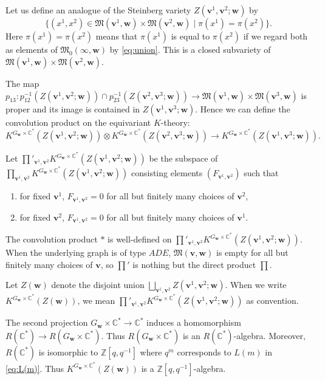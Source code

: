\documentclass[12pt]{amsart}
\def\Bbb{\mathbb}
\def\frak{\mathfrak}
\theoremstyle{definition}
\theoremstyle{remark}
\numberwithin{equation}{subsection}
\newcommand{\C}{{\Bbb C}}
\newcommand{\Z}{{\Bbb Z}}
\newcommand{\M}{{\frak M}} %
\newcommand{\bv}{{\mathbf v}} %
\newcommand{\bw}{{\mathbf w}} %
\newcommand{\Zw}{Z(\bw)}
\begin{document}
\subsection{}\label{subsec:homdef}
Let us define an analogue of the Steinberg variety
$Z(\bv^1,\bv^2;\bw)$ by
\begin{equation}\label{eq:def_Steinberg}
   \{ (x^1, x^2)\in \M(\bv^1,\bw)\times\M(\bv^2,\bw) \mid
 \pi(x^1) = \pi(x^2)
\}.
\end{equation}
Here $\pi(x^1) = \pi(x^2)$ means that $\pi(x^1)$ is equal to
$\pi(x^2)$ if we regard both as elements of $\M_0(\infty,\bw)$ by
\eqref{eq:union}. This is a closed subvariety of
$\M(\bv^1,\bw)\times\M(\bv^2,\bw)$.

The map
$p_{13}\colon p_{12}^{-1}(Z(\bv^1,\bv^2;\bw))\cap
p_{23}^{-1}(Z(\bv^2,\bv^3;\bw)) \to \M(\bv^1,\bw)\times\M(\bv^3,\bw)$
is proper and its image is contained in $Z(\bv^1,\bv^3;\bw)$.
Hence we can define the
convolution product on the equivariant $K$-theory:
\begin{equation*}
  K^{G_\bw\times\C^*}(Z(\bv^1,\bv^2;\bw))\otimes
  K^{G_\bw\times\C^*}(Z(\bv^2,\bv^3;\bw))
  \to K^{G_\bw\times\C^*}(Z(\bv^1,\bv^3;\bw)).
\end{equation*}

Let $\prod'_{\bv^1,\bv^2} K^{G_\bw\times\C^*}(Z(\bv^1,\bv^2;\bw))$ be the
subspace of $\prod_{\bv^1,\bv^2} K^{G_\bw\times\C^*}(Z(\bv^1,\bv^2;\bw))$ 
consisting elements $(F_{\bv^1,\bv^2})$ such that
\begin{enumerate}
\item for fixed $\bv^1$, $F_{\bv^1,\bv^2} = 0$ for all but finitely
many choices of $\bv^2$,
\item for fixed $\bv^2$, $F_{\bv^1,\bv^2} = 0$  for all but finitely
many choices of $\bv^1$.
\end{enumerate}
The convolution product $*$ is well-defined on
$\prod'_{\bv^1,\bv^2} K^{G_\bw\times\C^*}(Z(\bv^1,\bv^2;\bw))$. When the
underlying graph is of type $ADE$, $\M(\bv,\bw)$ is empty for all but 
finitely many choices of $\bv$, so $\prod'$ is nothing but the direct
product $\prod$.

Let $\Zw$ denote the disjoint union
$\bigsqcup_{\bv^1,\bv^2} Z(\bv^1,\bv^2;\bw)$. When we write
$K^{G_\bw\times\C^*}(\Zw)$, we mean
$\prod'_{\bv^1,\bv^2} K^{G_\bw\times\C^*}(Z(\bv^1,\bv^2;\bw))$
as convention.

The second projection $G_\bw\times\C^*\to \C^*$ induces a homomorphism
$R(\C^*)\to R(G_\bw\times\C^*)$. Thus $R(G_\bw\times\C^*)$ is an
$R(\C^*)$-algebra. Moreover, $R(\C^*)$ is isomorphic to
$\Z[q,q^{-1}]$ where $q^m$ corresponds to $L(m)$ in \eqref{eq:L(m)}.
Thus $K^{G_\bw\times\C^*}(\Zw)$ is a
$\Z[q,q^{-1}]$-algebra.
\end{document}
